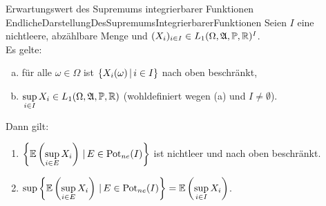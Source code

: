 \begin{lemma}{Erwartungswert des Supremums integrierbarer Funktionen}
            {EndlicheDarstellungDesSupremumsIntegrierbarerFunktionen}
Seien $I$ eine nichtleere, abzählbare Menge und 
$(X_{i})_{i \in I} \in L_1(\Omega, \mathfrak{A}, \mathbb{P}, \mathbb{R})^I$.\\
Es gelte:
\begin{enumerate}[(a)]
\item für alle 
     $\omega \in \Omega$ ist $\left\{X_i(\omega)\,|\,i \in I\right\}$
     nach oben beschränkt,
\item $\underset{i \in I}\sup\, X_i \in L_1(\Omega, \mathfrak{A}, \mathbb{P}, \mathbb{R})$
(wohldefiniert wegen (a) und $I\neq \emptyset$).
\end{enumerate}
Dann gilt:
\begin{enumerate}[(1)]
\item\label{EndlicheDarstellungDesSupremumsIntegrierbarerFunktionen1}
 $\left\{\mathbb{E}\left( \underset{i \in E}\sup\, X_i \right)\,|\,E \in \mathop{\textrm{Pot}}\nolimits_{ne}(I)\right\} $
    ist nichtleer und nach oben beschränkt.
\item\label{EndlicheDarstellungDesSupremumsIntegrierbarerFunktionen2}
 $\sup\left\{\mathbb{E}\left( \underset{i \in E}\sup\, X_i\right)\,|\,E \in \mathop{\textrm{Pot}}\nolimits_{ne}(I)\right\} 
    = \mathbb{E}\left(\underset{i \in I}\sup\, X_i \right)$.
\end{enumerate}
\end{lemma}
